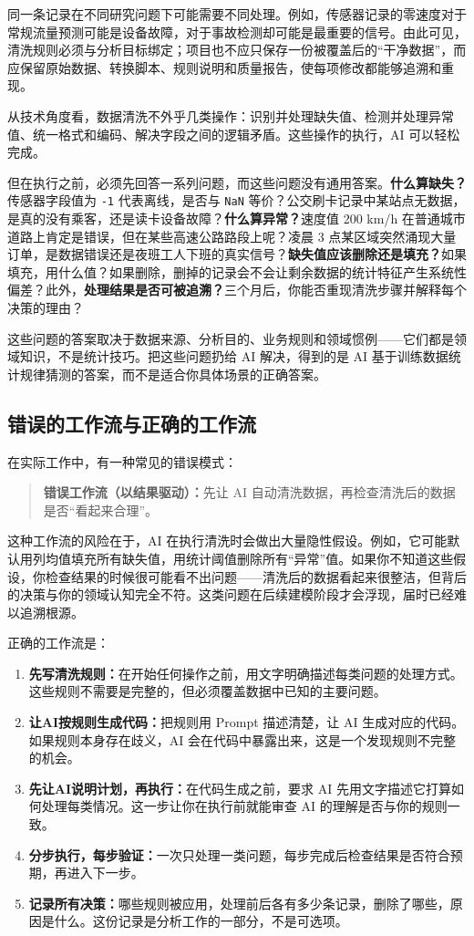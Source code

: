 同一条记录在不同研究问题下可能需要不同处理。例如，传感器记录的零速度对于常规流量预测可能是设备故障，对于事故检测却可能是最重要的信号。由此可见，清洗规则必须与分析目标绑定；项目也不应只保存一份被覆盖后的“干净数据”，而应保留原始数据、转换脚本、规则说明和质量报告，使每项修改都能够追溯和重现。

从技术角度看，数据清洗不外乎几类操作：识别并处理缺失值、检测并处理异常值、统一格式和编码、解决字段之间的逻辑矛盾。这些操作的执行，AI 可以轻松完成。

但在执行之前，必须先回答一系列问题，而这些问题没有通用答案。\textbf{什么算缺失？}传感器字段值为 \texttt{-1} 代表离线，是否与 \texttt{NaN} 等价？公交刷卡记录中某站点无数据，是真的没有乘客，还是读卡设备故障？\textbf{什么算异常？}速度值 200 km/h 在普通城市道路上肯定是错误，但在某些高速公路路段上呢？凌晨 3 点某区域突然涌现大量订单，是数据错误还是夜班工人下班的真实信号？\textbf{缺失值应该删除还是填充？}如果填充，用什么值？如果删除，删掉的记录会不会让剩余数据的统计特征产生系统性偏差？此外，\textbf{处理结果是否可被追溯？}三个月后，你能否重现清洗步骤并解释每个决策的理由？

这些问题的答案取决于数据来源、分析目的、业务规则和领域惯例——它们都是领域知识，不是统计技巧。把这些问题扔给 AI 解决，得到的是 AI 基于训练数据统计规律猜测的答案，而不是适合你具体场景的正确答案。

\subsection{错误的工作流与正确的工作流}

在实际工作中，有一种常见的错误模式：

\begin{quote}
\textbf{错误工作流（以结果驱动）：}先让 AI 自动清洗数据，再检查清洗后的数据是否“看起来合理”。
\end{quote}

这种工作流的风险在于，AI 在执行清洗时会做出大量隐性假设。例如，它可能默认用列均值填充所有缺失值，用统计阈值删除所有“异常”值。如果你不知道这些假设，你检查结果的时候很可能看不出问题——清洗后的数据看起来很整洁，但背后的决策与你的领域认知完全不符。这类问题在后续建模阶段才会浮现，届时已经难以追溯根源。

正确的工作流是：

\begin{enumerate}
  \item \textbf{先写清洗规则：}在开始任何操作之前，用文字明确描述每类问题的处理方式。这些规则不需要是完整的，但必须覆盖数据中已知的主要问题。
  \item \textbf{让AI按规则生成代码：}把规则用 Prompt 描述清楚，让 AI 生成对应的代码。如果规则本身存在歧义，AI 会在代码中暴露出来，这是一个发现规则不完整的机会。
  \item \textbf{先让AI说明计划，再执行：}在代码生成之前，要求 AI 先用文字描述它打算如何处理每类情况。这一步让你在执行前就能审查 AI 的理解是否与你的规则一致。
  \item \textbf{分步执行，每步验证：}一次只处理一类问题，每步完成后检查结果是否符合预期，再进入下一步。
  \item \textbf{记录所有决策：}哪些规则被应用，处理前后各有多少条记录，删除了哪些，原因是什么。这份记录是分析工作的一部分，不是可选项。
\end{enumerate}


